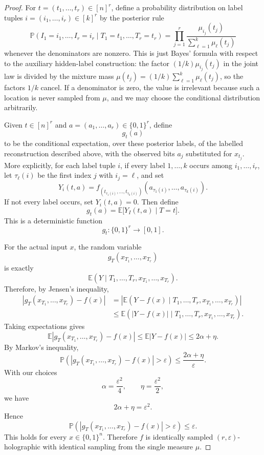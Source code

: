\documentclass[11pt]{amsart}
\newcommand{\1}{\mathbf 1}
\begin{document}
\begin{proof}
For \(t=(t_1,\ldots,t_r)\in[n]^r\), define a probability distribution on label
tuples \(i=(i_1,\ldots,i_r)\in[k]^r\) by the posterior rule
\[
        \mathbb P(I_1=i_1,\ldots,I_r=i_r\mid T_1=t_1,\ldots,T_r=t_r)
        =
        \prod_{j=1}^r
        \frac{\mu_{i_j}(t_j)}
        {\sum_{\ell=1}^k \mu_\ell(t_j)}
\]
whenever the denominators are nonzero.  This is just Bayes' formula with
respect to the auxiliary hidden-label construction: the factor
\((1/k)\mu_{i_j}(t_j)\) in the joint law is divided by the mixture mass
\(\mu(t_j)=(1/k)\sum_{\ell=1}^k\mu_\ell(t_j)\), so the factors \(1/k\) cancel.
If a denominator is zero, the value is irrelevant because such a location is
never sampled from \(\mu\), and we may choose the conditional distribution
arbitrarily.

Given \(t\in[n]^r\) and \(a=(a_1,\ldots,a_r)\in\{0,1\}^r\), define
\[
        g_t(a)
\]
to be the conditional expectation, over these posterior labels, of the labelled
reconstruction described above, with the observed bits \(a_j\) substituted for
\(x_{t_j}\).  More explicitly, for each label tuple \(i\), if every label
\(1,\ldots,k\) occurs among \(i_1,\ldots,i_r\), let \(\tau_\ell(i)\) be the
first index \(j\) with \(i_j=\ell\), and set
\[
        Y_i(t,a)
        =
        f_{(t_{\tau_1(i)},\ldots,t_{\tau_k(i)})}
        (a_{\tau_1(i)},\ldots,a_{\tau_k(i)}).
\]
If not every label occurs, set \(Y_i(t,a)=0\).  Then define
\[
        g_t(a)
        =
        \mathbb E\bigl[ Y_I(t,a)\mid T=t\bigr].
\]
This is a deterministic function
\[
        g_t:\{0,1\}^r\to[0,1].
\]

For the actual input \(x\), the random variable
\[
        g_T(x_{T_1},\ldots,x_{T_r})
\]
is exactly
\[
        \mathbb E(Y\mid T_1,\ldots,T_r,x_{T_1},\ldots,x_{T_r}).
\]
Therefore, by Jensen's inequality,
\[
\begin{aligned}
        \left|
        g_T(x_{T_1},\ldots,x_{T_r})-f(x)
        \right|
        &=
        \left|
        \mathbb E(Y-f(x)\mid T_1,\ldots,T_r,x_{T_1},\ldots,x_{T_r})
        \right|                                                   \\
        &\leq
        \mathbb E\left(
        |Y-f(x)|
        \mid T_1,\ldots,T_r,x_{T_1},\ldots,x_{T_r}
        \right).
\end{aligned}
\]
Taking expectations gives
\[
        \mathbb E
        \left|
        g_T(x_{T_1},\ldots,x_{T_r})-f(x)
        \right|
        \leq
        \mathbb E |Y-f(x)|
        \leq
        2\alpha+\eta .
\]
By Markov's inequality,
\[
        \mathbb P\left(
        \left|
        g_T(x_{T_1},\ldots,x_{T_r})-f(x)
        \right|
        >\varepsilon
        \right)
        \leq
        \frac{2\alpha+\eta}{\varepsilon}.
\]
With our choices
\[
        \alpha=\frac{\varepsilon^2}{4},
        \qquad
        \eta=\frac{\varepsilon^2}{2},
\]
we have
\[
        2\alpha+\eta=\varepsilon^2.
\]
Hence
\[
        \mathbb P\left(
        \left|
        g_T(x_{T_1},\ldots,x_{T_r})-f(x)
        \right|
        >\varepsilon
        \right)
        \leq \varepsilon .
\]
This holds for every \(x\in\{0,1\}^n\).  Therefore \(f\) is
identically sampled \((r,\varepsilon)\)-holographic with identical sampling
from the single measure \(\mu\).
\end{proof}
\end{document}
